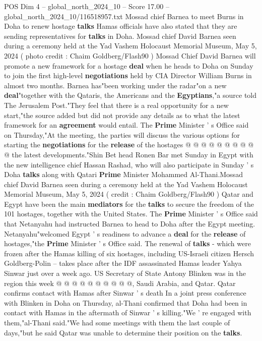 \begin{textsample}{POS Dim 4 – global\_north\_2024\_10 – Score 17.00 – global\_north\_2024\_10/116518957.txt}  \label{ex:f4_pos_406}
Mossad chief Barnea to meet Burns in Doha to renew hostage \textbf{talks} Hamas officials have also stated that they are sending representatives for \textbf{talks} in Doha.
Mossad chief David Barnea seen during a ceremony held at the Yad Vashem Holocaust Memorial Museum, May 5, 2024 ( photo credit : Chaim Goldberg/Flash90 ) Mossad Chief David Barnea will promote a new framework for a hostage \textbf{deal} when he heads to Doha on Sunday to join the first high-level \textbf{negotiations} held by CIA Director William Burns in almost two months.
Barnea has"been working under the radar"on a new \textbf{deal}"together with the Qataris, the Americans and the \textbf{Egyptians},"a source told The Jerusalem Post."They feel that there is a real opportunity for a new start,"the source added but did not provide any details as to what the latest framework for an \textbf{agreement} would entail.
The \textbf{Prime} Minister ' s Office said on Thursday,"At the meeting, the parties will discuss the various options for starting the \textbf{negotiations} for the \textbf{release} of the hostages @ @ @ @ @ @ @ @ @ @ the latest developments."Shin Bet head Ronen Bar met Sunday in Egypt with the new intelligence chief Hassan Rashad, who will also participate in Sunday ' s Doha \textbf{talks} along with Qatari \textbf{Prime} Minister Mohammed Al-Thani.Mossad chief David Barnea seen during a ceremony held at the Yad Vashem Holocaust Memorial Museum, May 5, 2024 ( credit : Chaim Goldberg/Flash90 ) Qatar and Egypt have been the main \textbf{mediators} for the \textbf{talks} to secure the freedom of the 101 hostages, together with the United States.
The \textbf{Prime} Minister ' s Office said that Netanyahu had instructed Barnea to head to Doha after the Egypt meeting.
Netanyahu"welcomed Egypt ' s readiness to advance a \textbf{deal} for the \textbf{release} of hostages,"the \textbf{Prime} Minister ' s Office said.
The renewal of \textbf{talks} - which were frozen after the Hamas killing of six hostages, including US-Israeli citizen Hersch Goldberg-Polin -- takes place after the IDF assassinated Hamas leader Yahya Sinwar just over a week ago.
US Secretary of State Antony Blinken was in the region this week @ @ @ @ @ @ @ @ @ @, Saudi Arabia, and Qatar.
Qatar confirms contact with Hamas after Sinwar ' s death In a joint press conference with Blinken in Doha on Thursday, al-Thani confirmed that Doha had been in contact with Hamas in the aftermath of Sinwar ' s killing."We ' re engaged with them,"al-Thani said."We had some meetings with them the last couple of days,"but he said Qatar was unable to determine their position on the \textbf{talks}.

\end{textsample}
